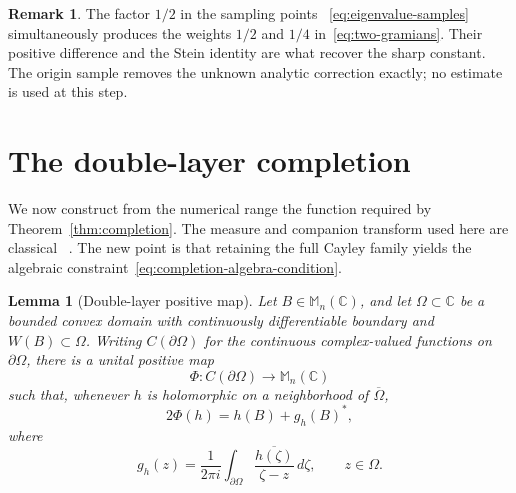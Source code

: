 \documentclass{aomart}
\newtheorem{lemma}[theorem]{Lemma}
\theoremstyle{definition}
\newtheorem{remark}[theorem]{Remark}
\newcommand{\C}{\mathbb C}
\newcommand{\Mn}{\mathbb M_n(\C)}
\begin{document}
\begin{remark}
\label{rem:completion-novelty}
The factor $1/2$ in the sampling points~%
\eqref{eq:eigenvalue-samples} simultaneously produces the weights
$1/2$ and $1/4$ in~\eqref{eq:two-gramians}.  Their positive difference
and the Stein identity are what recover the sharp constant.  The
origin sample removes the unknown analytic correction exactly; no
estimate is used at this step.
\end{remark}

\section{The double-layer completion}
\label{sec:double-layer}

We now construct from the numerical range the function required by
Theorem~\ref{thm:completion}.  The measure and companion transform used
here are classical~%
\cite{DelyonDelyon1999,Crouzeix2007,CrouzeixPalencia2017}.  The new
point is that retaining the full Cayley family yields the algebraic
constraint~\eqref{eq:completion-algebra-condition}.

\begin{lemma}[Double-layer positive map]
\label{lem:double-layer-map}
Let $B\in\Mn$, and let $\Omega\subset\C$ be a bounded convex domain
with continuously differentiable boundary and
$W(B)\subset\Omega$.  Writing $C(\partial\Omega)$ for the continuous
complex-valued functions on $\partial\Omega$, there is a unital positive map
\[
  \Phi\colon C(\partial\Omega)\longrightarrow\Mn
\]
such that, whenever $h$ is holomorphic on a neighborhood of
$\overline\Omega$,
\begin{equation}
  2\Phi(h)=h(B)+g_h(B)^*,
  \label{eq:double-layer-identity}
\end{equation}
where
\begin{equation}
  g_h(z)=\frac{1}{2\pi i}
  \int_{\partial\Omega}
  \frac{\overline{h(\zeta)}}{\zeta-z}\,d\zeta,
  \qquad z\in\Omega.
  \label{eq:companion-transform}
\end{equation}
\end{lemma}
\end{document}
